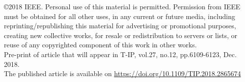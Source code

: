 \documentclass[journal,onecolumn,12pt]{IEEEtran}
\begin{document}
    
\noindent \copyright 2018 IEEE. Personal use of this material is permitted. Permission from IEEE must be obtained for all other uses, in any current or future media, including reprinting/republishing this material for advertising or promotional purposes, creating new collective works, for resale or redistribution to servers or lists, or reuse of any copyrighted component of this work in other works.
\\

\noindent Pre-print of article that will appear in T-IP, vol.27, no.12, pp.6109-6123, Dec. 2018.
\\

\noindent The published article is available on \url{https://doi.org/10.1109/TIP.2018.2865674}


    
\end{document}
